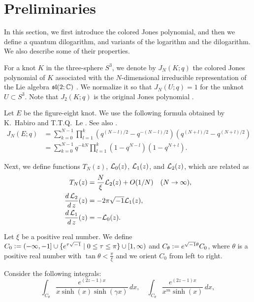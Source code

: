 \section{Preliminaries}
In this section, we first introduce the colored Jones polynomial, and then we define a quantum dilogarithm, and variants of the logarithm and the dilogarithm.
We also describe some of their properties.
\par
For a knot $K$ in the three-sphere $S^3$, we denote by $J_N(K;q)$ the colored Jones polynomial of $K$ associated with the $N$-dimensional irreducible representation of the Lie algebra $\frak{sl}(2;\mathbb{C})$ \cite{Kirby/Melvin:INVEM1991,Reshetikhin/Turaev:INVEM1991}.
We normalize it so that $J_N(U;q)=1$ for the unknot $U\subset S^3$.
Note that $J_2(K;q)$ is the original Jones polynomial \cite{Jones:BULAM31985}.
\par
Let $E$ be the figure-eight knot.
We use the following formula obtained by K.~Habiro \cite[P.~36 (1)]{Habiro:SURIK2000} and T.T.Q.~Le \cite[P.~129]{Le:TOPOA2003}.
See also \cite{Masbaum:ALGGT12003}.
\begin{equation}\label{eq:J_N_fig8}
\begin{split}
  J_N(E;q)
  &=
  \sum_{k=0}^{N-1}
  \prod_{l=1}^{k}\left(q^{(N-l)/2}-q^{-(N-l)/2}\right)\left(q^{(N+l)/2}-q^{(N+l)/2}\right)
  \\
  &=
  \sum_{k=0}^{N-1}
  q^{-kN}
  \prod_{l=1}^{k}\left(1-q^{N-l}\right)\left(1-q^{N+l}\right).
\end{split}
\end{equation}
\par
Next, we define functions $T_N(z)$, $\mathcal{L}_{0}(z)$, $\mathcal{L}_{1}(z)$, and $\mathcal{L}_{2}(z)$, which are related as
\begin{align*}
  T_{N}(z)
  &=
  \frac{N}{\xi}\mathcal{L}_{2}(z)+O(1/N)\quad(N\to\infty),
  \\
  \frac{d\,\mathcal{L}_{2}}{d\,z}(z)
  &=
  -2\pi\sqrt{-1}\mathcal{L}_{1}(z),
  \\
  \frac{d\,\mathcal{L}_{1}}{d\,z}(z)
  &=
  -\mathcal{L}_{0}(z).
\end{align*}
\par
Let $\xi$ be a positive real number.
We define $C_{0}:=(-\infty,-1]\cup\{e^{\tau\sqrt{-1}}\mid0\le\tau\le\pi\}\cup[1,\infty)$ and $C_{\theta}:=e^{\sqrt{-1}\theta}C_{0}$, where $\theta$ is a positive real number with $\tan\theta<\frac{\pi}{\xi}$ and we orient $C_{0}$ from left to right.
\par
Consider the following integrals:
\begin{equation*}
  \int_{C_{\theta}}\frac{e^{(2z-1)x}}{x\sinh(x)\sinh(\gamma x)}\,dx,
  \quad
  \int_{C_{\theta}}\frac{e^{(2z-1)x}}{x^{m}\sinh(x)}\,dx,
\end{equation*}
